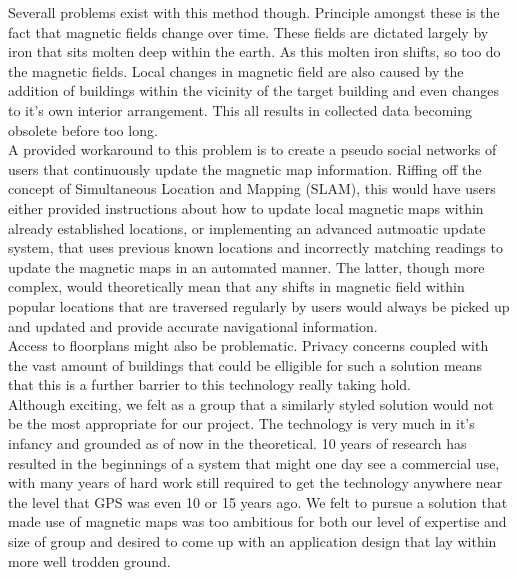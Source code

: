 \documentclass[main.tex]{subfiles}
\begin{document}
 Severall problems exist with this method though. Principle amongst these is the fact that magnetic fields change over time. These fields are dictated largely by iron that sits molten deep within the earth. As this molten iron shifts, so too do the magnetic fields. Local changes in magnetic field are also caused by the addition of buildings within the vicinity of the target building and even changes to it's own interior arrangement. This all results in collected data becoming obsolete before too long.\\
 
 A provided workaround to this problem is to create a pseudo social networks of users that continuously update the magnetic map information. Riffing off the concept of Simultaneous Location and Mapping (SLAM), this would have users either provided instructions about how to update local magnetic maps within already established locations, or implementing an advanced autmoatic update system, that uses previous known locations and incorrectly matching readings to update the magnetic maps in an automated manner. The latter, though more complex, would theoretically mean that any shifts in magnetic field within popular locations that are traversed regularly by users would always be picked up and updated and provide accurate navigational information.\\
 
 Access to floorplans might also be problematic. Privacy concerns coupled with the vast amount of buildings that could be elligible for such a solution means that this is a further barrier to this technology really taking hold.\\
 
 Although exciting, we felt as a group that a similarly styled solution would not be the most appropriate for our project. The technology is very much in it's infancy and grounded as of now in the theoretical. 10 years of research has resulted in the beginnings of a system that might one day see a commercial use, with many years of hard work still required to get the technology anywhere near the level that GPS was even 10 or 15 years ago. We felt to pursue a solution that made use of magnetic maps was too ambitious for both our level of expertise and size of group and desired to come up with an application design that lay within more well trodden ground.
 

 
\end{document}

